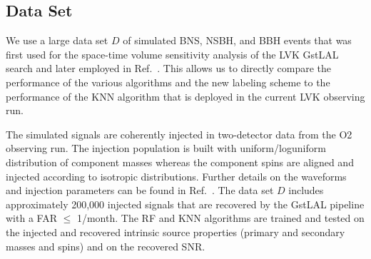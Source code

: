 \subsection{Data Set} \label{dataset}

We use a large data set $D$ of simulated \ac{BNS}, \ac{NSBH}, and \ac{BBH} events that was first used for the space-time volume sensitivity analysis of the \ac{LVK} GstLAL search
\cite{Sachdev:2019vvd,PhysRevD.95.042001,Sachdev:2020lfd} and later employed in Ref.~\cite{Chatterjee:2019avs}. This allows us to directly compare the performance of the various
algorithms and the new labeling scheme to the performance of the \ac{KNN} algorithm that is deployed in the current \ac{LVK} observing run. 

The simulated signals are coherently injected in two-detector data from the \ac{O2}  observing run. The injection population is built with uniform/loguniform distribution of
component masses whereas the component spins are aligned and injected according to isotropic distributions. Further details on the waveforms and injection parameters can be found in
Ref.~\cite{Chatterjee:2019avs}. The data set $D$ includes approximately 200,000 injected signals that are recovered by the GstLAL pipeline with a \ac{FAR} $\le$ 1/month. The \ac{RF} and
\ac{KNN} algorithms are trained and tested on the injected and recovered intrinsic source properties (primary and secondary masses and spins) and on the recovered \ac{SNR}. 

